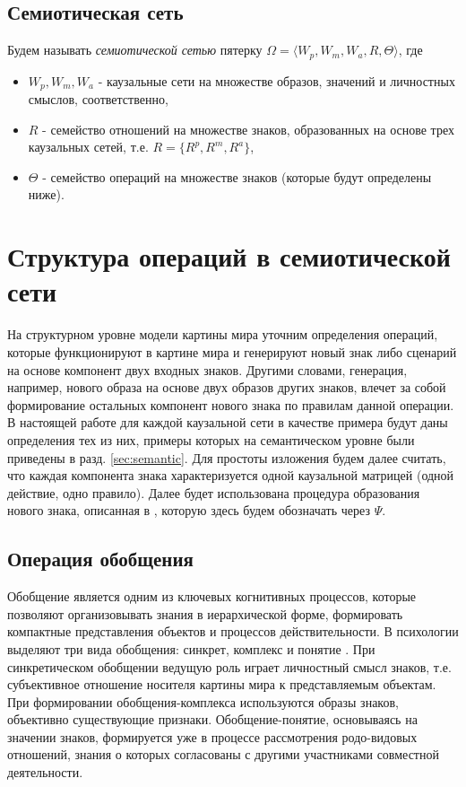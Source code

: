 \documentclass[12pt]{scrartcl}
\begin{document}
	\subsection{Семиотическая сеть}
	Будем называть \textit{семиотической сетью} пятерку $\Omega=\langle W_p, W_m, W_a, R, \Theta \rangle$, где
	\begin{itemize}
		\item $W_p, W_m, W_a$ - каузальные сети на множестве образов, значений и личностных смыслов, соответственно,
		\item $R$ - семейство отношений на множестве знаков, образованных на основе трех каузальных сетей, т.е. $R=\{R^p, R^m, R^a\}$,
		\item $\Theta$ - семейство операций на множестве знаков (которые будут определены ниже).
	\end{itemize} 
	

	\section{Структура операций в семиотической сети}\label{sec:operations}
	На структурном уровне модели картины мира уточним определения операций, которые функционируют в картине мира и генерируют новый знак либо сценарий на основе компонент двух входных знаков. Другими словами, генерация, например, нового образа на основе двух образов других знаков, влечет за собой формирование остальных компонент нового знака по  правилам данной операции. В настоящей работе для каждой каузальной сети в качестве примера будут даны определения тех из них, примеры которых на семантическом уровне были приведены в разд. \ref{sec:semantic}. Для простоты изложения будем далее считать, что каждая компонента знака характеризуется одной каузальной матрицей (одной действие, одно правило). Далее будет использована процедура образования нового знака, описанная в \cite{Osipov2014c}, которую здесь будем обозначать через $\Psi$.
	
	\subsection{Операция обобщения}
	
	Обобщение является одним из ключевых когнитивных процессов, которые позволяют организовывать знания в иерархической форме, формировать компактные представления объектов и процессов действительности. В психологии выделяют три вида обобщения: синкрет, комплекс и понятие \cite{Vygotsky1999}. При синкретическом обобщении ведущую роль играет личностный смысл знаков, т.е. субъективное отношение носителя картины мира к представляемым объектам. При формировании обобщения-комплекса используются образы знаков, объективно существующие признаки. Обобщение-понятие, основываясь на значении знаков, формируется уже в процессе рассмотрения родо-видовых отношений, знания о которых согласованы с другими участниками совместной деятельности.
	
\end{document}
